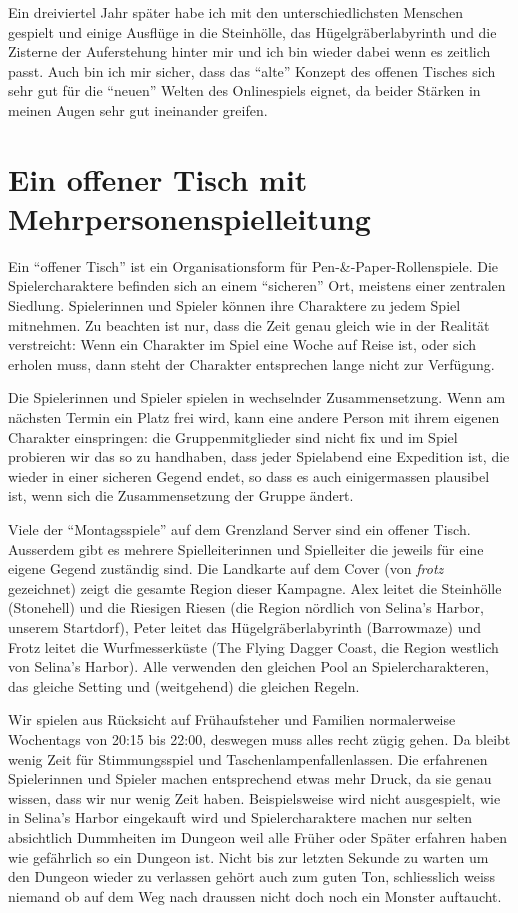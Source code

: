 \documentclass[11pt]{wbzine}
\begin{document}
\begin{multicols}{2}
Ein dreiviertel Jahr später habe ich mit den unterschiedlichsten
Menschen gespielt und einige Ausflüge in die Steinhölle, das
Hügelgräberlabyrinth und die Zisterne der Auferstehung hinter mir und
ich bin wieder dabei wenn es zeitlich passt. Auch bin ich mir sicher,
dass das ``alte'' Konzept des offenen Tisches sich sehr gut für die ``neuen''
Welten des Onlinespiels eignet, da beider Stärken in meinen Augen sehr
gut ineinander greifen.


\section{Ein offener Tisch mit Mehrpersonenspielleitung}
\label{open-tables}
Ein “offener Tisch” ist ein Organisationsform für Pen-\&-Paper-Rollenspiele.
Die Spielercharaktere befinden sich an einem “sicheren” Ort, meistens einer
zentralen Siedlung. Spielerinnen und Spieler können ihre Charaktere zu jedem
Spiel mitnehmen. Zu beachten ist nur, dass die Zeit genau gleich wie in der
Realität verstreicht: Wenn ein Charakter im Spiel eine Woche auf Reise ist,
oder sich erholen muss, dann steht der Charakter entsprechen lange nicht zur
Verfügung.

Die Spielerinnen und Spieler spielen in wechselnder Zusammensetzung. Wenn am
nächsten Termin ein Platz frei wird, kann eine andere Person mit ihrem eigenen
Charakter einspringen: die Gruppenmitglieder sind nicht fix und im Spiel
probieren wir das so zu handhaben, dass jeder Spielabend eine Expedition ist,
die wieder in einer sicheren Gegend endet, so dass es auch einigermassen
plausibel ist, wenn sich die Zusammensetzung der Gruppe ändert.

Viele der ``Montagsspiele'' auf dem Grenzland Server sind ein offener Tisch.
Ausserdem gibt es mehrere Spielleiterinnen und Spielleiter die jeweils für
eine eigene Gegend zuständig sind. Die Landkarte auf dem Cover (von \textit{frotz}
gezeichnet) zeigt die
gesamte Region dieser Kampagne. Alex leitet die Steinhölle (Stonehell) und die
Riesigen Riesen (die Region nördlich von Selina's Harbor, unserem Startdorf),
Peter leitet das Hügelgräberlabyrinth (Barrowmaze) und Frotz leitet die
Wurfmesserküste (The Flying Dagger Coast, die Region westlich von Selina's
Harbor). Alle verwenden den gleichen Pool an Spielercharakteren, das gleiche
Setting und (weitgehend) die gleichen Regeln.

Wir spielen aus Rücksicht auf Frühaufsteher und Familien normalerweise
Wochentags von 20:15 bis 22:00, deswegen muss alles recht zügig gehen. Da
bleibt wenig Zeit für Stimmungsspiel und Taschenlampenfallenlassen. Die
erfahrenen Spielerinnen und Spieler machen entsprechend etwas mehr Druck, da
sie genau wissen, dass wir nur wenig Zeit haben. Beispielsweise wird nicht
ausgespielt, wie in Selina's Harbor eingekauft wird und Spielercharaktere
machen nur selten absichtlich Dummheiten im Dungeon weil alle Früher oder
Später erfahren haben wie gefährlich so ein Dungeon ist. Nicht bis zur letzten
Sekunde zu warten um den Dungeon wieder zu verlassen gehört auch zum guten Ton,
schliesslich weiss niemand ob auf dem Weg nach draussen nicht doch noch ein
Monster auftaucht.


\end{multicols}
\end{document}
